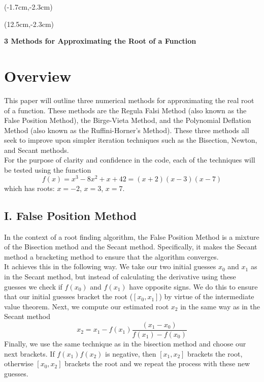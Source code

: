 \documentclass[12pt, oneside]{article}
\begin{document}
\begin{textblock*}{4cm}(-1.7cm,-2.3cm)
\end{textblock*}

\begin{textblock*}{8cm}(12.5cm,-2.3cm)
\end{textblock*}


\makeatletter
\setlength{\@fptop}{0pt}
\makeatother

\begin{center}
\textbf{\large 3 Methods for Approximating the Root of a Function}
\end{center}


\section*{Overview}

This paper will outline three numerical methods for approximating the real root of a function. These methods are the Regula Falsi Method (also known as the False Position Method), the Birge-Vieta Method, and the Polynomial Deflation Method (also known as the Ruffini-Horner's Method). These three methods all seek to improve upon simpler iteration techniques such as the Bisection, Newton, and Secant methods.\\

For the purpose of clarity and confidence in the code, each of the techniques will be tested using the function
\[f(x) = x^3 - 8x^2 + x +42 = (x+2)(x-3)(x-7)\]
which has roots: $x=-2$, $x=3$, $x=7$.\\


\subsection*{I. False Position Method}
In the context of a root finding algorithm, the False Position Method is a mixture of the Bisection method and the Secant method. Specifically, it makes the Secant method a bracketing method to ensure that the algorithm converges.\\

It achieves this in the following way. We take our two initial guesses $x_0$ and $x_1$ as in the Secant method, but instead of calculating the derivative using these guesses we check if $f(x_0)$ and $f(x_1)$ have opposite signs. We do this to ensure that our initial guesses bracket the root ($[x_0,x_1]$) by virtue of the intermediate value theorem. Next, we compute our estimated root $x_2$ in the same way as in the Secant method
\[x_2 = x_1 - f(x_1)\frac{(x_1 - x_0)}{f(x_1)-f(x_0)}\]
Finally, we use the same technique as in the bisection method and choose our next brackets. If $f(x_1)f(x_2)$ is negative, then $[x_1,x_2]$ brackets the root, otherwise $[x_0,x_2]$ brackets the root and we repeat the process with these new guesses.\\
\end{document}
